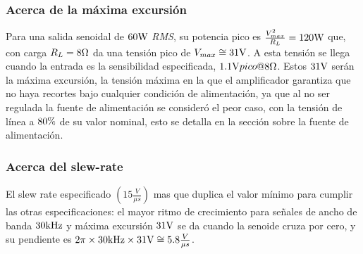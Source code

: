  
\subsubsection{Acerca de la máxima excursión}
 
 \begin{sloppypar}
 
Para una salida senoidal de $60\si[per-mode=symbol]{\watt}$ \textit{RMS}, su potencia pico es ${\frac{V_{max}^2}{R_L} = 120\si[per-mode=symbol]{\watt}}$ que, con carga ${R_L=8\si[per-mode=symbol]{\ohm}}$ da una tensión pico de ${V_{max} \cong 31 \si[per-mode=symbol]{\volt}}$. A esta tensión se llega cuando la entrada es la sensibilidad especificada, ${1.1\si[per-mode=symbol]{\volt} pico @8\si[per-mode=symbol]{\ohm}}$. Estos ${31 \si[per-mode=symbol]{\volt}}$ serán la máxima excursión, la tensión máxima en la que el amplificador garantiza que no haya recortes bajo cualquier condición de alimentación, ya que al no ser regulada la fuente de alimentación se consideró el peor caso, con la tensión de línea a ${80\si[per-mode=symbol]{\percent}}$ de su valor nominal, esto se detalla en la sección sobre la fuente de alimentación.

\end{sloppypar}


\subsubsection{Acerca del slew-rate}

\begin{sloppypar}

El slew rate especificado ${\left(15\frac{V}{\mu s}\right)}$ mas que duplica el valor mínimo para cumplir las otras especificaciones: el mayor ritmo de crecimiento para señales de ancho de banda $30\si[per-mode=symbol]{\kilo\hertz}$ y máxima excursión $31\si[per-mode=symbol]{\volt}$ se da cuando la senoide cruza por cero, y su pendiente es ${2 \pi \times 30\si[per-mode=symbol]{\kilo\hertz}\times 31\si[per-mode=symbol]{\volt} \cong 5.8\frac{V}{\mu s}}$. 

\end{sloppypar}